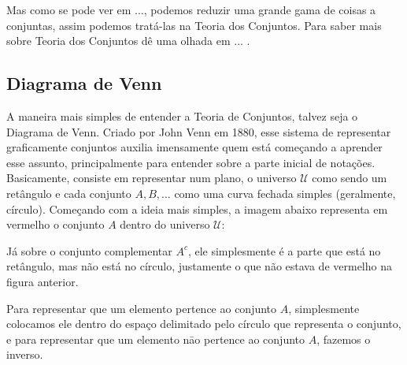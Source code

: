     Mas como se pode ver em ..., podemos reduzir uma grande gama de coisas a conjuntas, assim podemos tratá-las na Teoria dos Conjuntos. Para saber mais sobre Teoria dos Conjuntos dê uma olhada em ... .

    \subsection{Diagrama de Venn}
    A maneira mais simples de entender a Teoria de Conjuntos, talvez seja o Diagrama de Venn. Criado por John Venn em 1880, esse sistema de representar graficamente conjuntos auxilia imensamente quem está começando a aprender esse assunto, principalmente para entender sobre a parte inicial de notações. Basicamente, consiste em representar num plano, o universo $\mathcal U$ como sendo um retângulo e cada conjunto $A,B,...$ como uma curva fechada simples (geralmente, círculo). Começando com a ideia mais simples, a imagem abaixo representa em vermelho o conjunto $A$ dentro do universo $\mathcal U$:
    
    
    Já sobre o conjunto complementar $A^c$, ele simplesmente é a parte que está no retângulo, mas não está no círculo, justamente o que não estava de vermelho na figura anterior.
    
    
    Para representar que um elemento pertence ao conjunto $A$, simplesmente colocamos ele dentro do espaço delimitado pelo círculo que representa o conjunto, e para representar que um elemento nāo pertence ao conjunto $A$, fazemos o inverso.
    
    
    
